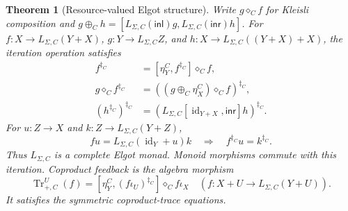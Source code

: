 \documentclass[11pt,a4paper]{article}
\numberwithin{algorithm}{section}
\numberwithin{equation}{section}
\newtheorem{theorem}{Theorem}[section]
\theoremstyle{definition}
\theoremstyle{remark}
\theoremstyle{plain}
\newcommand{\LC}{L_{\Sigma,C}}
\newcommand{\id}{\operatorname{id}}
\theoremstyle{definition}
\theoremstyle{plain}
\begin{document}
\begin{theorem}[Resource-valued Elgot structure]\label{thm:weighted-elgot}
Write $g\diamond_C f$ for Kleisli composition and
$g\oplus_C h=[\LC(\mathsf{inl})g,\LC(\mathsf{inr})h]$.
For $f:X\to\LC(Y+X)$, $g:Y\to\LC Z$, and
$h:X\to\LC((Y+X)+X)$, the iteration operation satisfies
\begin{align}
 f^{\ddagger_C}&=[\eta^C_Y,f^{\ddagger_C}]\diamond_C f,
 \label{eq:weighted-fix}\\
 g\diamond_C f^{\ddagger_C}
 &=((g\oplus_C\eta^C_X)\diamond_C f)^{\ddagger_C},
 \label{eq:weighted-nat}\\
 (h^{\ddagger_C})^{\ddagger_C}
 &=(\LC[\id_{Y+X},\mathsf{inr}]h)^{\ddagger_C}.
 \label{eq:weighted-codiag}
\end{align}
For $u:Z\to X$ and $k:Z\to\LC(Y+Z)$,
\[
 fu=\LC(\id_Y+u)k\quad\Longrightarrow\quad f^{\ddagger_C}u=k^{\ddagger_C}.
\]
Thus $\LC$ is a complete Elgot monad. Monoid morphisms commute with
this iteration. Coproduct feedback is the algebra morphism
\begin{equation}\label{eq:weighted-trace}
 \operatorname{Tr}^{U}_{+,C}(f)
 =[\eta^C_Y,(f\iota_U)^{\ddagger_C}]\diamond_C f\iota_X
 \quad(f:X+U\to\LC(Y+U)).
\end{equation}
It satisfies the symmetric coproduct-trace equations.
\end{theorem}
\end{document}
